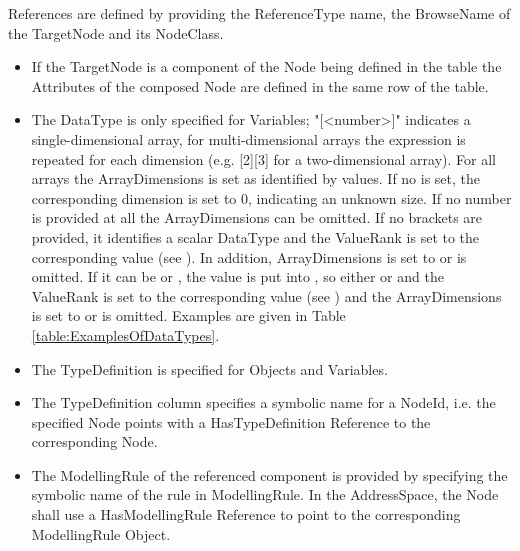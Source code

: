 \glspl{Reference} are defined by providing the \gls{ReferenceType} name, the \gls{BrowseName} of the \gls{TargetNode} and its \gls{NodeClass}.

\begin{itemize}
    \item If the \gls{TargetNode} is a component of the \gls{Node} being defined in the table the \glspl{Attribute} of the composed Node are defined in the same row of the table. 
    \item The \gls{DataType} is only specified for Variables; "[<number>]" indicates a single-dimensional array, for multi-dimensional arrays the expression is repeated for each dimension (e.g. [2][3] for a two-dimensional array). For all arrays the \glspl{ArrayDimension} is set as identified by  values. If no  is set, the corresponding dimension is set to 0, indicating an unknown size. If no number is provided at all the \glspl{ArrayDimension} can be omitted. If no brackets are provided, it identifies a scalar \gls{DataType} and the \gls{ValueRank} is set to the corresponding value (see \cite{UAPart3}). In addition, \glspl{ArrayDimension} is set to  or is omitted. If it can be  or , the value is put into , so either  or  and the \gls{ValueRank} is set to the corresponding value (see \cite{UAPart3}) and the \glspl{ArrayDimension} is set to  or is omitted. Examples are given in Table \ref{table:ExamplesOfDataTypes}.
    \item The \gls{TypeDefinition} is specified for Objects and Variables.
    \item The \gls{TypeDefinition} column specifies a symbolic name for a \gls{NodeId}, i.e. the specified \gls{Node} points with a \gls{HasTypeDefinition} \gls{Reference} to the corresponding Node.
    \item The \gls{ModellingRule} of the referenced component is provided by specifying the symbolic name of the rule in \gls{ModellingRule}. In the \gls{AddressSpace}, the Node shall use a \gls{HasModellingRule} \gls{Reference} to point to the corresponding \gls{ModellingRule} \gls{Object}.
\end{itemize}

